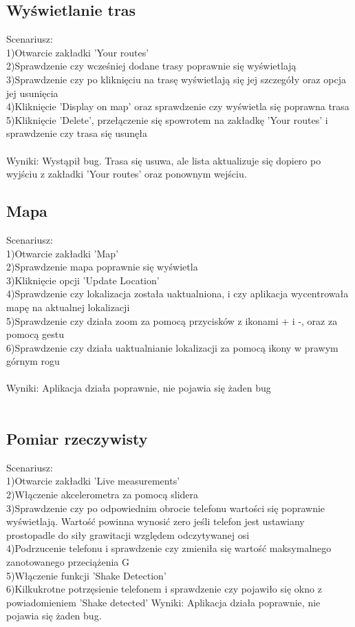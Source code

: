 \subsection{Wyświetlanie tras} %
Scenariusz:\\
1)Otwarcie zakładki 'Your routes'\\
2)Sprawdzenie czy wcześniej dodane trasy poprawnie się wyświetlają\\
3)Sprawdzenie czy po kliknięciu na trasę wyświetlają się jej szczegóły oraz opcja jej usunięcia\\
4)Kliknięcie 'Display on map' oraz sprawdzenie czy wyświetla się poprawna trasa\\
5)Kliknięcie 'Delete', przełączenie się spowrotem na zakładkę 'Your routes' i sprawdzenie czy trasa się usunęła\\\\
Wyniki: Wystąpił bug. Trasa się usuwa, ale lista aktualizuje się dopiero po wyjściu z zakładki 'Your routes' oraz ponownym wejściu.
\subsection{Mapa} %
Scenariusz:\\
1)Otwarcie zakładki 'Map'\\
2)Sprawdzenie mapa poprawnie się wyświetla\\
3)Kliknięcie opcji 'Update Location'\\
4)Sprawdzenie czy lokalizacja została uaktualniona, i czy aplikacja wycentrowała mapę na aktualnej lokalizacji\\
5)Sprawdzenie czy działa zoom za pomocą przycisków z ikonami + i -, oraz za pomocą gestu\\
6)Sprawdzenie czy działa uaktualnianie lokalizacji za pomocą ikony w prawym górnym rogu \\\\
Wyniki: Aplikacja działa poprawnie, nie pojawia się żaden bug\\\\
\newpage
\subsection{Pomiar rzeczywisty} %
Scenariusz:\\
1)Otwarcie zakładki 'Live measurements'\\
2)Włączenie akcelerometra za pomocą slidera\\
3)Sprawdzenie czy po odpowiednim obrocie telefonu wartości się poprawnie wyświetlają. Wartość powinna wynosić zero jeśli telefon jest ustawiany prostopadle do siły grawitacji względem odczytywanej osi\\
4)Podrzucenie telefonu i sprawdzenie czy zmieniła się wartość maksymalnego zanotowanego przeciążenia G\\
5)Włączenie funkcji 'Shake Detection'\\
6)Kilkukrotne potrzęsienie telefonem i sprawdzenie czy pojawiło się okno z powiadomieniem 'Shake detected'
Wyniki: Aplikacja działa poprawnie, nie pojawia się żaden bug.

